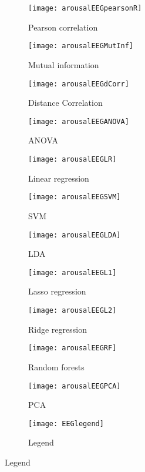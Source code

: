 \clearpage
\begin{figure}[!tbp]
  \centering
  \caption{Selection features for arousal classification, using only EEG features.\label{arousalEEGpies}}
  \begin{subfigure}[b]{0.3\textwidth}
    \texttt{[image: arousalEEGpearsonR]}
    \caption{Pearson correlation}
  \end{subfigure}
  \hfill
  \begin{subfigure}[b]{0.3\textwidth}
    \texttt{[image: arousalEEGMutInf]}
    \caption{Mutual information}
  \end{subfigure}
  \hfill
  \begin{subfigure}[b]{0.3\textwidth}
    \texttt{[image: arousalEEGdCorr]}
    \caption{Distance Correlation}
  \end{subfigure}
  
  \begin{subfigure}[b]{0.3\textwidth}
    \texttt{[image: arousalEEGANOVA]}
    \caption{ANOVA}
  \end{subfigure}
  \hfill
  \begin{subfigure}[b]{0.3\textwidth}
    \texttt{[image: arousalEEGLR]}
    \caption{Linear regression}
  \end{subfigure}
  \hfill
  \begin{subfigure}[b]{0.3\textwidth}
    \texttt{[image: arousalEEGSVM]}
    \caption{SVM}
  \end{subfigure}
  
  \begin{subfigure}[b]{0.3\textwidth}
    \texttt{[image: arousalEEGLDA]}
    \caption{LDA}
  \end{subfigure}
  \hfill
  \begin{subfigure}[b]{0.3\textwidth}
    \texttt{[image: arousalEEGL1]}
    \caption{Lasso regression}
  \end{subfigure}
  \hfill
  \begin{subfigure}[b]{0.3\textwidth}
    \texttt{[image: arousalEEGL2]}
    \caption{Ridge regression}
  \end{subfigure}
  
  \begin{subfigure}[b]{0.3\textwidth}
    \texttt{[image: arousalEEGRF]}
    \caption{Random forests}
  \end{subfigure}
  \hfill
  \begin{subfigure}[b]{0.3\textwidth}
    \texttt{[image: arousalEEGPCA]}
    \caption{PCA}
  \end{subfigure}
  \hfill
  \begin{subfigure}[b]{0.3\textwidth}
    \texttt{[image: EEGlegend]}
    \caption{Legend\label{arousalpiesEEGlegend}}
  \end{subfigure}
\end{figure}


